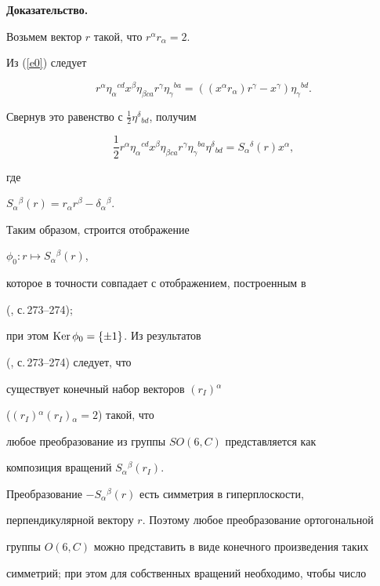 {\bf Доказательство.}


Возьмем вектор $r$ такой, что $r^\alpha r_\alpha = 2$.


Из (\ref{e0}) следует


$$




r^\alpha \eta_\alpha{}^{cd}x^\beta \eta_{\beta ca}


r^\gamma \eta_\gamma{}^{ba}=((x^\alpha r_\alpha)r^\gamma-x^\gamma)


\eta_\gamma{}^{bd}.


$$


Свернув это равенство с $\frac{1}{2} \eta^\delta{}_{bd}$, получим


$$


\frac{1}{2}r^\alpha \eta_\alpha{}^{cd}x^\beta \eta_{\beta ca}


r^\gamma \eta_\gamma{}^{ba} \eta^\delta{}_{bd} =


S_\alpha{}^\delta(r)x^\alpha,


$$


где


$S_\alpha{}^\beta (r)=r_\alpha r^\beta-\delta_\alpha{}^\beta$.


Таким образом, строится отображение


$\phi_0: r \longmapsto S_\alpha{}^\beta(r)$,


которое в точности совпадает с отображением, построенным в


(\cite{Post1}, с.\,273--274);


при этом $\operatorname{Ker} \phi_0=\{\pm 1\}$. Из результатов


(\cite{Post1}, с.\,273--274) следует, что


существует конечный набор векторов $(r_I){}^\alpha$


($(r_I){}^\alpha (r_I){}_\alpha=2$) такой, что


любое преобразование из группы $SO(6,C)$ представляется как


композиция вращений $S_\alpha{}^\beta (r_I)$.





Преобразование $-S_\alpha{}^\beta (r)$ есть симметрия в гиперплоскости,


перпендикулярной вектору $r$. Поэтому любое преобразование ортогональной


группы $O(6,C)$ можно представить в виде конечного произведения таких


симметрий; при этом для собственных вращений необходимо, чтобы число



